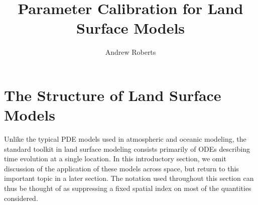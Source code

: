 \documentclass[12pt]{article}
\title{Parameter Calibration for Land Surface Models}
\author{Andrew Roberts}
\begin{document}
\maketitle

\section{The Structure of Land Surface Models}
Unlike the typical PDE models used in atmospheric and oceanic modeling, the standard toolkit in land surface modeling 
consists primarily of ODEs describing time evolution at a single location. In this introductory section, we omit discussion 
of the application of these models across space, but return to this important topic in a later section. The notation 
used throughout this section can thus be thought of as suppressing a fixed spatial index on most of the quantities considered. 
\end{document}
